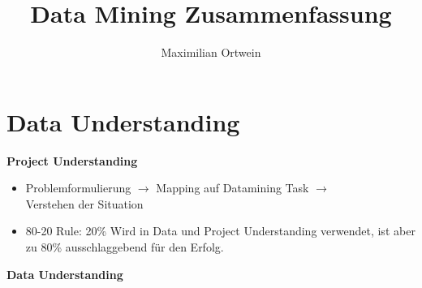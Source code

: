 \documentclass[a4paper]{scrartcl}
\begin{document}
\author{Maximilian Ortwein}
\title{Data Mining Zusammenfassung }
\fancyfoot[C]{\thepage}
\renewcommand{\footrulewidth}{0.5pt}
\renewcommand{\headrulewidth}{0.5pt}
\maketitle
\tableofcontents
\pagebreak

\section{Data Understanding} 
\textbf{Project Understanding}
\begin{itemize}
\item Problemformulierung $\to$ Mapping auf Datamining Task $\to$ \\Verstehen der Situation
\item 80-20 Rule: 20\% Wird in Data und Project Understanding verwendet, ist aber zu 80\% ausschlaggebend für den Erfolg.
\end{itemize}
\textbf{Data Understanding}
\end{document}
